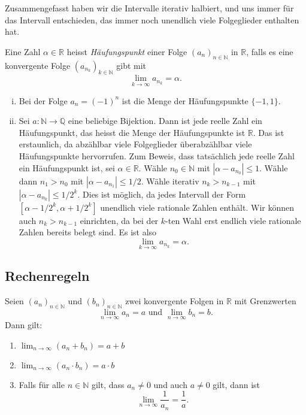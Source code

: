 \documentclass[../main.tex]{subfiles}
\begin{document}
Zusammengefasst haben wir die Intervalle
iterativ halbiert, und uns immer für das Intervall
entschieden, das immer noch unendlich viele
Folgeglieder enthalten hat.

\begin{definition}
  Eine Zahl $\alpha \in \mathbb{R}$ heisst
  \emph{Häufungspunkt} einer Folge
  ${(a_{n})}_{n \in \mathbb{N}}$ in $\mathbb{R}$,
  falls es eine konvergente Folge
  ${(a_{n_k})}_{k \in \mathbb{N}}$ gibt
  mit
  \[
    \lim_{k \to \infty} a_{n_k} = \alpha.
  \]
\end{definition}

\begin{examples}
  \leavevmode
  \begin{enumerate}[(i)]
    \item Bei der Folge $a_n = (-1)^n$ ist die Menge
      der Häufungspunkte $\{-1, 1\}$.
    \item Sei $a \colon \mathbb{N} \to \mathbb{Q}$ eine
      beliebige
      Bijektion. Dann ist jede reelle Zahl ein Häufungspunkt,
      das heisst die Menge der Häufungspunkte
      ist $\mathbb{R}$. Das ist erstaunlich, da abzählbar
      viele Folgeglieder überabzählbar viele
      Häufungspunkte hervorrufen. Zum Beweis,
      dass tatsächlich jede reelle Zahl ein Häufungspunkt
      ist, sei $\alpha \in \mathbb{R}$. Wähle
      $n_0 \in \mathbb{N}$ mit $|\alpha - a_{n_0}| \leq 1$.
      Wähle dann $n_{1} > n_0$ mit $|\alpha - a_{n_1}| \leq 1/2$.
      Wähle iterativ $n_{k} > n_{k-1}$ mit $|\alpha - a_{n_k}|
      \leq 1/2^k$. Dies ist möglich, da jedes Intervall der
      Form
      $[\alpha - 1/2^k, \alpha + 1/2^k]$ unendlich viele
      rationale Zahlen enthält. Wir können auch $n_k > n_{k-1}$
      einrichten, da bei der $k$-ten Wahl erst endlich viele
      rationale Zahlen bereits belegt sind.
      Es ist also
      \[
        \lim_{k \to \infty} a_{n_k} = \alpha.
      \]
  \end{enumerate}
\end{examples}


\subsection*{Rechenregeln}
\begin{proposition}
  Seien ${(a_n)}_{n \in \mathbb{N}}$ und
  ${(b_n)}_{n \in \mathbb{N}}$ zwei
  konvergente Folgen in $\mathbb{R}$ mit Grenzwerten
  \[
    \lim_{n \to \infty} a_n = a \text{ und }
    \lim_{n \to \infty} b_n = b.
  \]
  Dann gilt:
  \begin{enumerate}[\normalfont(i)]
    \item $\lim_{n \to \infty} (a_n + b_n) = a + b$ 
    \item $\lim_{n \to \infty} (a_n \cdot b_n) = a \cdot b$
    \item Falls für alle $n \in \mathbb{N}$ gilt,
      dass $a_n \neq 0$ und auch $a \neq 0$ gilt,
      dann ist
      \[
        \lim_{n \to \infty} \frac{1}{a_n} = \frac{1}{a}.
      \]
  \end{enumerate}
\end{proposition}
\end{document}
